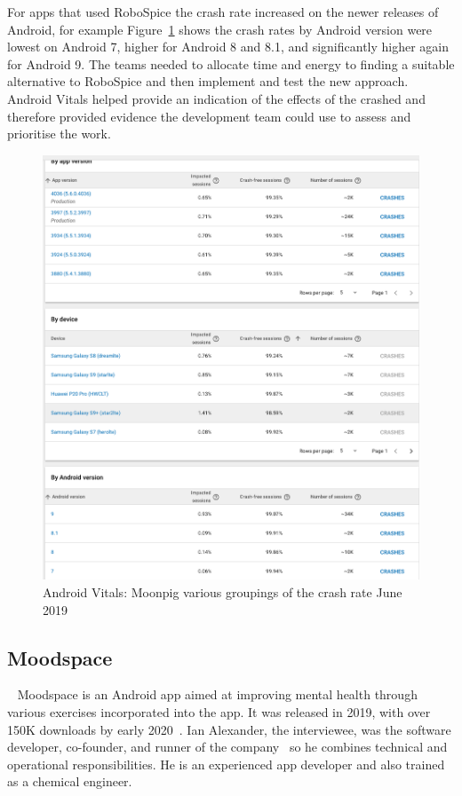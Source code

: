 For apps that used RoboSpice the crash rate increased on the newer releases of Android, for example Figure~\ref{fig:av-moonpig-crash-rate-groupings} shows the crash rates by Android version were lowest on Android 7, higher for Android 8 and 8.1, and significantly higher again for Android 9. The teams needed to allocate time and energy to finding a suitable alternative to RoboSpice and then implement and test the new approach. Android Vitals helped provide an indication of the effects of the crashed and therefore provided evidence the development team could use to assess and prioritise the work.

\begin{figure}
    \centering
    \includegraphics[width=13cm]{images/android-vitals-screenshots/moonpig/Screenshot 2019-06-10 at 15.41.23.png}
    \caption{Android Vitals: Moonpig various groupings of the crash rate  June 2019}
    \label{fig:av-moonpig-crash-rate-groupings}
\end{figure}

\subsection{Moodspace}~\label{study-moodspace}
Moodspace is an Android app aimed at improving mental health through various exercises incorporated into the app. It was released in 2019, with over 150K downloads by early 2020~\citep{objectbox2020_moodspace_interview}. Ian Alexander, the interviewee, was the software developer, co-founder, and runner of the company~\citep{objectbox2020_moodspace_interview} so he combines technical and operational responsibilities. He is an experienced app developer and also trained as a chemical engineer.  %

